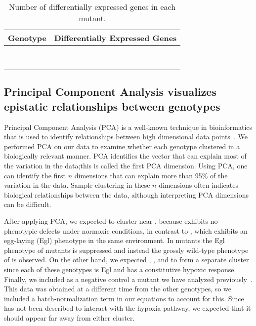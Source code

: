 \begin{table}[tbhp]
  \centering
  \begin{tabular}{lr}
    \toprule{}
    Genotype & Differentially Expressed Genes \\
    \midrule{}
    \egl{} & \egln{}\\
    \rhy{} & \rhyn{}\\
    \vhl{} & \vhln{}\\
    \hif{} & \hifn{}\\
    \eglvhl{} & \eglvhln{}\\
    \eglhif{} & \eglhifn{}\\
    \fog{} & \fogn{}\\
    \bottomrule{}
  \end{tabular}
  \caption{Number of differentially expressed genes in each mutant.}
\label{tab:genes}
\end{table}

\subsection*{Principal Component Analysis visualizes epistatic relationships between genotypes}
\label{sub:Clustering}

Principal Component Analysis (PCA) is a well-known technique in bioinformatics that is
used to identify relationships between high dimensional data points~\citep{Yeung2001}.
We performed PCA on our data to examine whether each genotype clustered in a biologically
relevant manner. PCA identifies the vector that can explain most of the variation
in the data;this is called the first PCA dimension. Using PCA, one can identify
the first $n$ dimensions that can explain more than 95\% of the variation in the
data. Sample clustering in these $n$ dimensions often indicates biological
relationships between the data, although interpreting PCA dimensions can be
difficult.

After applying PCA, we expected \hif{} to cluster near \eglhif{}, because
\hif{} exhibits no phenotypic defects under normoxic conditions, in contrast to
\egl{}, which exhibits an egg-laying (Egl) phenotype in the same environment.
In \eglhif{} mutants the Egl phenotype of \egl{} mutants is suppressed and instead
the grossly wild-type phenotype of \hif{} is observed. On the other hand, we
expected \egl{}, \rhy{}, \vhl{} and \eglvhl{} to form a separate cluster since
each of these genotypes is Egl and has a constitutive hypoxic response. Finally,
we included as a negative control a \fog{} mutant we have analyzed
previously~\citep{Angeles-Albores2016a}. This data was obtained at a different
time from the other genotypes, so we included a batch-normalization term in our
equations to account for this. Since  has not been described
to interact with the hypoxia pathway, we expected that it should appear far away
from either cluster.

